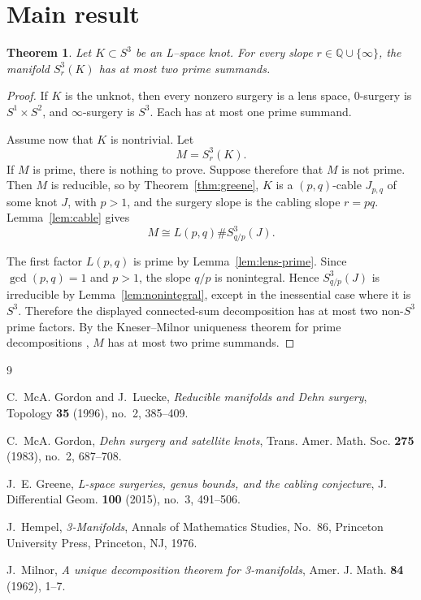 \documentclass[11pt]{article}
\newtheorem{theorem}{Theorem}
\begin{document}
\section*{Main result}

\begin{theorem}
Let \(K \subset S^3\) be an L--space knot.  For every slope
\(r \in \mathbb Q \cup \{\infty\}\), the manifold \(S^3_r(K)\) has at most two
prime summands.
\end{theorem}

\begin{proof}
If \(K\) is the unknot, then every nonzero surgery is a lens space, \(0\)-surgery
is \(S^1 \times S^2\), and \(\infty\)-surgery is \(S^3\).  Each has at most one
prime summand.

Assume now that \(K\) is nontrivial.  Let
\[
M = S^3_r(K).
\]
If \(M\) is prime, there is nothing to prove.  Suppose therefore that \(M\) is
not prime.  Then \(M\) is reducible, so by Theorem~\ref{thm:greene}, \(K\) is a
\((p,q)\)-cable \(J_{p,q}\) of some knot \(J\), with \(p>1\), and the surgery
slope is the cabling slope \(r=pq\).  Lemma~\ref{lem:cable} gives
\[
M \cong L(p,q) \# S^3_{q/p}(J).
\]

The first factor \(L(p,q)\) is prime by Lemma~\ref{lem:lens-prime}.  Since
\(\gcd(p,q)=1\) and \(p>1\), the slope \(q/p\) is nonintegral.  Hence
\(S^3_{q/p}(J)\) is irreducible by Lemma~\ref{lem:nonintegral}, except in the
inessential case where it is \(S^3\).  Therefore the displayed connected-sum
decomposition has at most two non-\(S^3\) prime factors.  By the
Kneser--Milnor uniqueness theorem for prime decompositions \cite{Milnor},
\(M\) has at most two prime summands.
\end{proof}

\begin{thebibliography}{9}

C.~McA. Gordon and J.~Luecke,
\emph{Reducible manifolds and Dehn surgery},
Topology \textbf{35} (1996), no.~2, 385--409.

C.~McA. Gordon,
\emph{Dehn surgery and satellite knots},
Trans. Amer. Math. Soc. \textbf{275} (1983), no.~2, 687--708.

J.~E. Greene,
\emph{L-space surgeries, genus bounds, and the cabling conjecture},
J. Differential Geom. \textbf{100} (2015), no.~3, 491--506.

J.~Hempel,
\emph{3-Manifolds},
Annals of Mathematics Studies, No.~86,
Princeton University Press, Princeton, NJ, 1976.

J.~Milnor,
\emph{A unique decomposition theorem for 3-manifolds},
Amer. J. Math. \textbf{84} (1962), 1--7.

\end{thebibliography}
\end{document}
